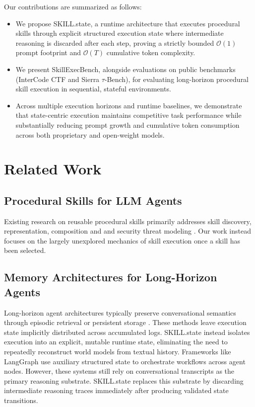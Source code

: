 \documentclass[11pt]{article}
\begin{document}
Our contributions are summarized as follows:
\begin{itemize}
    \item We propose SKILL.state, a runtime architecture that executes procedural skills through explicit structured execution state where intermediate reasoning is discarded after each step, proving a strictly bounded $\mathcal{O}(1)$ prompt footprint and $\mathcal{O}(T)$ cumulative token complexity.
    \item We present SkillExecBench, alongside evaluations on public benchmarks (InterCode CTF and Sierra $\tau$-Bench), for evaluating long-horizon procedural skill execution in sequential, stateful environments.
    \item Across multiple execution horizons and runtime baselines, we demonstrate that state-centric execution maintains competitive task performance while substantially reducing prompt growth and cumulative token consumption across both proprietary and open-weight models.
\end{itemize}

\section{Related Work}

\subsection{Procedural Skills for LLM Agents}
Existing research on reusable procedural skills primarily addresses skill discovery, representation, composition and and security threat modeling \citep{badhe2026systematic, badhe2026agentskillsecuritythreat}. Our work instead focuses on the largely unexplored mechanics of skill execution once a skill has been selected.

\subsection{Memory Architectures for Long-Horizon Agents}
Long-horizon agent architectures typically preserve conversational semantics through episodic retrieval \citep{park2023generative} or persistent storage \citep{chhikara2025mem0, zhong2024memorybank}. These methods leave execution state implicitly distributed across accumulated logs. SKILL.state instead isolates execution into an explicit, mutable runtime state, eliminating the need to repeatedly reconstruct world models from textual history. Frameworks like LangGraph use auxiliary structured state to orchestrate workflows across agent nodes. However, these systems still rely on conversational transcripts as the primary reasoning substrate. SKILL.state replaces this substrate by discarding intermediate reasoning traces immediately after producing validated state transitions.
\end{document}
